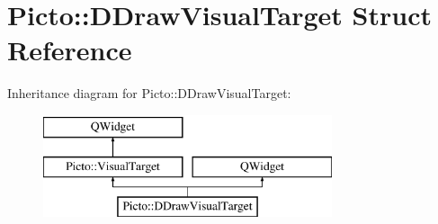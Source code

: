 \hypertarget{struct_picto_1_1_d_draw_visual_target}{\section{Picto\-:\-:D\-Draw\-Visual\-Target Struct Reference}
\label{struct_picto_1_1_d_draw_visual_target}
}
Inheritance diagram for Picto\-:\-:D\-Draw\-Visual\-Target\-:\begin{figure}[H]
\begin{center}
\leavevmode
\includegraphics[height=3.000000cm]{struct_picto_1_1_d_draw_visual_target}
\end{center}
\end{figure}
